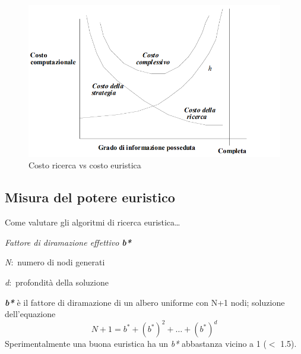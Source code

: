\begin{figure}[H]
	\centering
	\includegraphics[width=\textwidth]{immagini/ricerca_euristica.png}
	\caption*{Costo ricerca vs costo euristica}
	\label{fig:my_label}
\end{figure}

\subsection{Misura del potere euristico}

Come valutare gli algoritmi di ricerca euristica\dots
\begin{center}
	\textit{Fattore di diramazione effettivo \textbf{b*}}

	\textit{N}:\ numero di nodi generati

	\textit{d}:\ profondità della soluzione
\end{center}
\textbf{\textit{b*}} è il fattore di diramazione di un albero uniforme con N+1 nodi; soluzione dell'equazione
\[
	N + 1=b^*+(b^*)^2+ \dots + (b^*)^d
\]
Sperimentalmente una buona euristica ha un \textit{b*} abbastanza vicino a 1 ($<$ 1.5).

